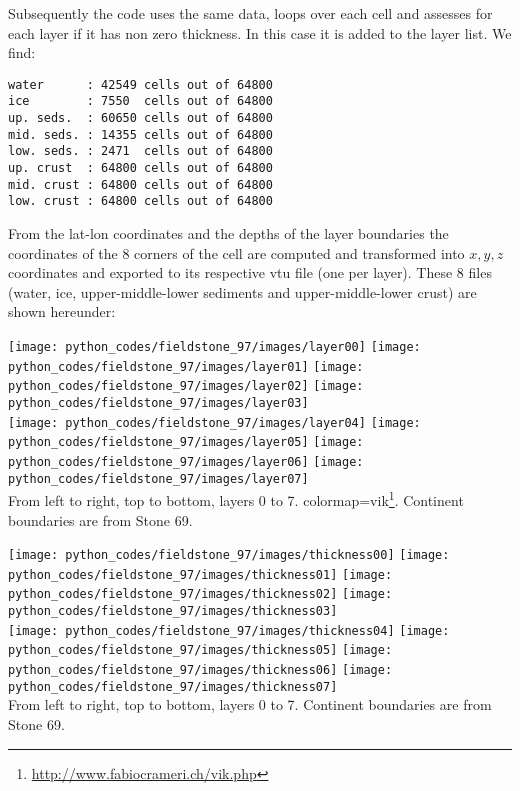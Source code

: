 Subsequently the code uses the same data, loops over each cell and assesses 
for each layer if it has non zero thickness. In this case it is added to 
the layer list. We find:

\begin{verbatim}
water      : 42549 cells out of 64800
ice        : 7550  cells out of 64800
up. seds.  : 60650 cells out of 64800
mid. seds. : 14355 cells out of 64800
low. seds. : 2471  cells out of 64800
up. crust  : 64800 cells out of 64800
mid. crust : 64800 cells out of 64800
low. crust : 64800 cells out of 64800
\end{verbatim}

From the lat-lon coordinates and the depths of the 
layer boundaries the coordinates of the 8 corners of the cell are 
computed and transformed into $x,y,z$ coordinates and exported to its 
respective vtu file (one per layer). These 8 files 
(water, ice, upper-middle-lower sediments and upper-middle-lower crust) are 
shown hereunder:

\begin{center}
\texttt{[image: python\_codes/fieldstone\_97/images/layer00]}
\texttt{[image: python\_codes/fieldstone\_97/images/layer01]}
\texttt{[image: python\_codes/fieldstone\_97/images/layer02]}
\texttt{[image: python\_codes/fieldstone\_97/images/layer03]}\\
\texttt{[image: python\_codes/fieldstone\_97/images/layer04]}
\texttt{[image: python\_codes/fieldstone\_97/images/layer05]}
\texttt{[image: python\_codes/fieldstone\_97/images/layer06]}
\texttt{[image: python\_codes/fieldstone\_97/images/layer07]}\\
{\captionfont 
From left to right, top to bottom, layers 0 to 7.
colormap=vik\footnote{\url{http://www.fabiocrameri.ch/vik.php}}.
Continent boundaries are from Stone 69.}
\end{center}

\begin{center}
\texttt{[image: python\_codes/fieldstone\_97/images/thickness00]}
\texttt{[image: python\_codes/fieldstone\_97/images/thickness01]}
\texttt{[image: python\_codes/fieldstone\_97/images/thickness02]}
\texttt{[image: python\_codes/fieldstone\_97/images/thickness03]}\\
\texttt{[image: python\_codes/fieldstone\_97/images/thickness04]}
\texttt{[image: python\_codes/fieldstone\_97/images/thickness05]}
\texttt{[image: python\_codes/fieldstone\_97/images/thickness06]}
\texttt{[image: python\_codes/fieldstone\_97/images/thickness07]}\\
{\captionfont 
From left to right, top to bottom, layers 0 to 7.
Continent boundaries are from Stone 69.}
\end{center}



